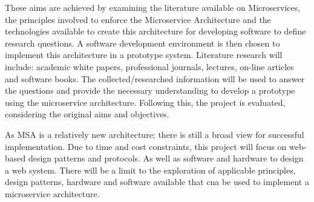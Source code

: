 	These aims are achieved by examining the literature available on Microservices, the principles involved to enforce the Microservice Architecture and the technologies available to create this architecture for developing software to define research questions.
	A software development environment is then chosen to implement this architecture in a prototype system.
	Literature research will include: academic white papers, professional journals, lectures, on-line articles and software books. The collected/researched information will be used to answer the questions and provide the necessary understanding to develop a prototype using the microservice architecture. Following this, the project is evaluated, considering the original aims and objectives.
	
	As MSA is a relatively new architecture; there is still a broad view for successful implementation. Due to time and cost constraints, this project will focus on web-based design patterns and protocols. As well as software and hardware to design a web system. There will be a limit to the exploration of  applicable principles, design patterns, hardware and software available that cna be used to implement a microservice architecture.
	
